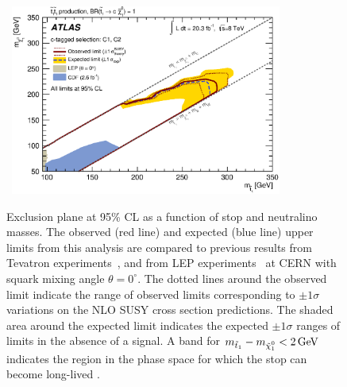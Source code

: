 \begin{figure}[!ht]
\begin{center}
\mbox{
\includegraphics[width=0.795\textwidth]{Appendix_CharmTagged/Figures/limitPlotStop_Stop_combined_C1_C2_.eps}
}
\end{center}
\caption[Exclusion plane at 95\% CL for stop pair production with $\stoptocharm$ as a function of the $m_{\stop}$ and $m_{\ninoone}$]{Exclusion plane at 95\% CL as a function of stop and neutralino masses. The observed (red line) and expected (blue line) upper limits from this analysis are compared to previous results from Tevatron experiments~\cite{Abazov:2008rc}, and from LEP experiments~\cite{Aaltonen:2012tq} at CERN with squark mixing angle $\theta=0^{\circ}$. The dotted lines around the observed limit indicate the range of observed limits corresponding to $\pm 1 \sigma$ variations on the NLO SUSY cross section predictions. The shaded area around the expected limit indicates the expected $\pm 1 \sigma$ ranges of limits in the absence of a signal. A band for $m_{\stopone} - m_{\ninoone}< \unit[2]{GeV}$ indicates the region in the phase space for which the stop can become long-lived \protect\cite{Aad:2014nra}.}
\label{fig:ExclusionStoptocharmCharmTagged}
\end{figure}
